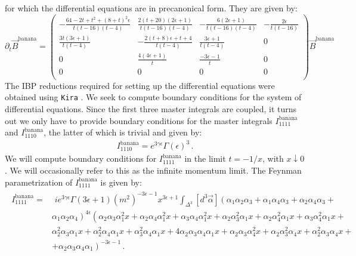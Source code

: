 \documentclass{article}
\begin{document}
for which the differential equations are in precanonical form. They are given by:
\begin{equation}
\partial_t\vec{B}^{\text{banana}} = 
\left(
\begin{array}{cccc}
 -\frac{64-2 t+t^{2}+(8+t)^{2} \epsilon}{t(t-16)(t-4)} & \frac{2 (t+20) (2 \epsilon +1)}{t(t-16) (t-4)} & -\frac{6 (2 \epsilon +1)}{t(t-16) (t-4)} & -\frac{2 \epsilon }{t(t-16)} \\
 \frac{3 t (3 \epsilon +1)}{t(t-4)} & -\frac{2(t+8) \epsilon+t+4}{t(t-4)} & \frac{3 \epsilon +1}{t(t-4)} & 0 \\
 0 & \frac{4 (4 \epsilon +1)}{t} & \frac{-3 \epsilon -1}{t} & 0 \\
 0 & 0 & 0 & 0 \\
\end{array}
\right)\vec{B}^{\text{banana}}
\end{equation}
The IBP reductions required for setting up the differential equations were obtained using \texttt{Kira} \cite{Maierhoefer:2017hyi, Maierhofer:2018gpa, Klappert:2020nbg}. We seek to compute boundary conditions for the system of differential equations. Since the first three master integrals are coupled, it turns out we only have to provide boundary conditions for the master integrals $I_{1111}^\text{banana}$ and $I_{1110}^\text{banana}$, the latter of which is trivial and given by:
\begin{align}
    I_{1110}^{\text{banana}} = e^{3 \gamma \epsilon} \Gamma(\epsilon)^{3}\,.
\end{align}
We will compute boundary conditions for $I_{1111}^\text{banana}$ in the limit $t = -1/x$, with $x\downarrow 0$. We will occasionally refer to this as the infinite momentum limit. The Feynman parametrization of $I_{1111}^{\text{banana}}$ is given by:
\begin{align}
    \begin{aligned}
I_{1111}^{\text{banana}} =  &\,\, i e^{3 \gamma \epsilon}  \Gamma(3 \epsilon+1) \left(m^{2}\right)^{-3 \epsilon-1} x^{3 \epsilon+1} \int_{\Delta^3}\left[d^3\vec{\alpha}\right]\left(\alpha_{1} \alpha_{2} \alpha_{3}+\alpha_{1} \alpha_{4} \alpha_{3}+\alpha_{2} \alpha_{4} \alpha_{3}+\right.\\
&\left.\alpha_{1} \alpha_{2} \alpha_{4}\right)^{4 \epsilon} \left(\alpha_{2} \alpha_{3} \alpha_{1}^{2} x+\alpha_{2} \alpha_{4} \alpha_{1}^{2} x+\alpha_{3} \alpha_{4} \alpha_{1}^{2} x+\alpha_{2} \alpha_{3}^{2} \alpha_{1} x+\alpha_{2} \alpha_{4}^{2} \alpha_{1} x+\alpha_{3} \alpha_{4}^{2} \alpha_{1} x+\right.\\
&\left.\alpha_{2}^{2} \alpha_{3} \alpha_{1} x+\alpha_{2}^{2} \alpha_{4} \alpha_{1} x+\alpha_{3}^{2} \alpha_{4} \alpha_{1} x+4 \alpha_{2} \alpha_{3} \alpha_{4} \alpha_{1} x+\alpha_{2} \alpha_{3} \alpha_{4}^{2} x+\alpha_{2} \alpha_{3}^{2} \alpha_{4} x+\alpha_{2}^{2} \alpha_{3} \alpha_{4} x+\right.\\
&\left.+\alpha_{2} \alpha_{3} \alpha_{4} \alpha_{1}\right)^{-3 \epsilon-1}\,.
\end{aligned}
\end{align}
\end{document}
